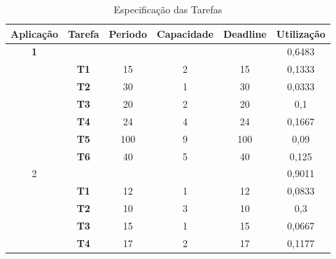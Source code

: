 \documentclass[12pt]{article}
\begin{document}
\begin{table}[h]
\centering
\caption{Especificação das Tarefas}
\label{tab:param}
\begin{tabular}{|c|c|c|c|c|c|}
\hline
\textbf{Aplicação} & \multicolumn{1}{l|}{\textbf{Tarefa}} & \textbf{Periodo} & \textbf{Capacidade} & \textbf{Deadline} & \textbf{Utilização} \\ \hline
\textbf{1}         &                                      &                  &                     &                   & 0,6483              \\ \hline
                   & \textbf{T1}                          & 15               & 2                   & 15                & 0,1333              \\ \hline
                   & \textbf{T2}                          & 30               & 1                   & 30                & 0,0333              \\ \hline
                   & \textbf{T3}                          & 20               & 2                   & 20                & 0,1                 \\ \hline
                   & \textbf{T4}                          & 24               & 4                   & 24                & 0,1667              \\ \hline
                   & \textbf{T5}                          & 100              & 9                   & 100               & 0,09                \\ \hline
                   & \textbf{T6}                          & 40               & 5                   & 40                & 0,125               \\ \hline
2                  &                                      &                  &                     &                   & 0,9011              \\ \hline
                   & \textbf{T1}                          & 12               & 1                   & 12                & 0,0833              \\ \hline
                   & \textbf{T2}                          & 10               & 3                   & 10                & 0,3                 \\ \hline
                   & \textbf{T3}                          & 15               & 1                   & 15                & 0,0667              \\ \hline
                   & \textbf{T4}                          & 17               & 2                   & 17                & 0,1177              \\ \hline

\end{tabular}
\end{table}
\end{document}
